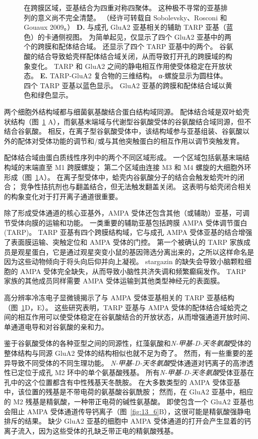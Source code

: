 \begin{figure}[htbp]
{		在跨膜区域，亚基结合为四重对称四聚体。
		这种极不寻常的亚基排列的意义尚不完全清楚。
		（经许可转载自 Sobolevsky、Rosconi 和 Gouaux 2009。）
		\textbf{D.} 与成孔 GluA2 亚基相关的辅助 TARP 亚基（蓝色）的卡通侧视图。
		为简单起见，仅显示了四个 GluA2 亚基中的两个的跨膜和配体结合域。
		还显示了四个 TARP 亚基中的两个。
		谷氨酸的结合导致蛤壳样配体结合域关闭，从而导致打开孔的跨膜域的构象变化。
		TARP 和 GluA2 之间的静电相互作用使受体稳定在开放状态\cite{mayer2016structural}。 
		\textbf{E.} TARP-GluA2 复合物的三维结构。
		α-螺旋显示为圆柱体。 四个 TARP 亚基以蓝色显示。
		GluA2 亚基的跨膜和配体结合域以黄色和绿色显示\cite{mayer2016structural}。}
	\label{fig:13_5}
\end{figure}


两个细胞外结构域都与细菌氨基酸结合蛋白结构域同源。 配体结合域是双叶蛤壳状结构（图~\ref{fig:13_5} A），而氨基末端域与代谢型谷氨酸受体的谷氨酸结合域同源，但不结合谷氨酸。
相反，在离子型谷氨酸受体中，该结构域参与亚基组装、谷氨酸以外的配体对受体功能的调节和/或与其他突触蛋白的相互作用以调节突触发育。


配体结合域由蛋白质线性序列中的两个不同区域形成。
一个区域包括氨基末端结构域的末端直至 M1 跨膜螺旋；
第二个区域由连接 M3 和 M4 螺旋的大细胞外环形成（图~\ref{fig:13_5}A）。
在离子型受体中，蛤壳内谷氨酸分子的结合会触发蛤壳叶的闭合；
竞争性拮抗剂也与翻盖结合，但无法触发翻盖关闭。
这表明与蛤壳闭合相关的构象变化对于打开离子通道很重要。


除了形成受体通道的核心亚基外，AMPA 受体还包含其他（或辅助）亚基，可调节受体向膜的运输和功能。
一类重要的辅助亚基包括跨膜 AMPA 受体调节蛋白 (TARP)。
TARP 亚基有四个跨膜结构域，它与成孔 AMPA 受体亚基的结合增强了表面膜运输、突触定位和 AMPA 受体的门控。
第一个被确认的 TARP 家族成员是观星蛋白，它是通过观星突变小鼠的基因筛选分离出来的，之所以这样命名是因为这些动物倾向于将头向后仰并向上凝视。
stargazin 的缺失会导致小脑颗粒细胞的 AMPA 受体完全缺失，从而导致小脑性共济失调和频繁癫痫发作。
TARP 家族的其他成员同样需要 AMPA 受体运输到其他类型神经元的表面膜。


高分辨率冷冻电子显微镜揭示了与 AMPA 受体亚基相关的 TARP 亚基结构（图~\ref{fig:13_5}D，E）。
这些研究表明，TARP 亚基与 AMPA 受体的配体结合域蛤壳之间的相互作用可以使受体稳定在谷氨酸结合的开放状态，从而增强通道开放时间、单通道电导和对谷氨酸的亲和力。


鉴于谷氨酸受体的各种亚型之间的同源性，红藻氨酸和\textit{N-甲基-D-天冬氨酸}受体的整体结构与同源 GluA2 受体的结构相似也就不足为奇了。
然而，有一些重要的差异导致不同受体的不同生理功能。 
\textit{N-甲基-D-天冬氨酸}受体通道对钙离子的高渗透性已定位于成孔 M2 环中的单个氨基酸残基。
所有\textit{N-甲基-D-天冬氨酸}受体亚基在孔中的这个位置都含有中性残基天冬酰胺。
在大多数类型的 AMPA 受体亚基中，该位置的残基是不带电荷的氨基酸谷氨酰胺；
然而，在 GluA2 亚基中，相应的 M2 残基是精氨酸，一种带正电荷的碱性氨基酸。
即使包含一个 GluA2 亚基也会阻止 AMPA 受体通道传导钙离子（图~\ref{fig:13_6}B），这很可能是精氨酸强静电排斥的结果。
缺少 GluA2 亚基的细胞中 AMPA 受体通道的打开会产生显着的钙离子流入，因为这些受体的孔缺乏带正电的精氨酸残基。


